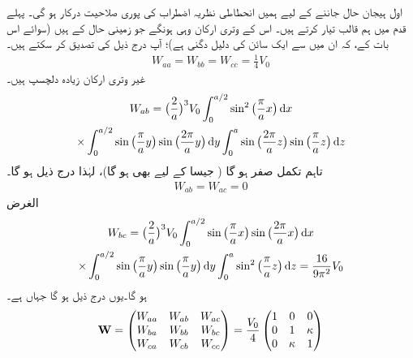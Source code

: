  اول ہیجان حال جاننے کے لیے ہمیں انحطاطی نظریہ اضطراب کی پوری صلاحیت درکار ہو گی۔ پہلے قدم میں ہم قالب  تیار کرتے ہیں۔ اس کے وتری ارکان وہی ہونگے جو زمینی حال کے ہیں (سوائے اس بات کے، کہ ان میں سے ایک سائن کی  دلیل دگنی ہے)؛ آپ درج ذیل کی تصدیق کر سکتے ہیں۔
\begin{align*}
W_{aa} = W_{bb} = W_{cc} = \frac{1}{4} V_0
\end{align*}
غیر وتری ارکان زیادہ دلچسپ ہیں۔ 
\begin{multline*}
W_{ab} = \big ( \frac{2}{a} \big )^3 V_0 \int_0^{a/2} \sin^2 \big ( \frac{\pi}{a} x \big ) \dif x\\
\times \int_0^{a/2} \sin \big (\frac{\pi}{a} y \big ) \sin \big ( \frac{2 \pi}{a} y \big ) \dif y \int_0^a \sin \big ( \frac{2 \pi}{a} z \big ) \sin \big ( \frac{\pi}{a} z \big ) \dif z
\end{multline*}
تاہم  تکمل صفر ہو گا ( جیسا  کے لیے بھی ہو گا)، لہٰذا درج ذیل ہو گا۔ 
\begin{align*}
W_{ab} = W_{ac} = 0
\end{align*}
الغرض 
\begin{multline*}
W_{bc} = \big ( \frac{2}{a} \big )^3 V_0 \int_0^{a/2} \sin \big ( \frac{\pi}{a} x \big ) \sin \big (\frac{2 \pi}{a} x \big ) \dif x\\
\times \int_0^{a/2} \sin \big (\frac{\pi}{a} y \big ) \sin \big ( \frac{\pi}{a} y \big ) \dif y \int_0^a \sin^2 \big ( \frac{\pi}{a} z \big ) \dif z = \frac{16}{9 \pi^2} V_0
\end{multline*}
ہو گا۔یوں درج ذیل ہو گا جہاں  ہے۔
\begin{align}
\operatorname{\mathbf{W}} =
\begin{pmatrix}
W_{aa} & W_{ab} & W_{ac} \\
W_{ba} & W_{bb} & W_{bc} \\
W_{ca} & W_{cb} & W_{cc}
\end{pmatrix}=
 \frac{V_0}{4}
\begin{pmatrix}
1 & 0 & 0 \\
0 & 1 & \kappa \\
0 & \kappa & 1
\end{pmatrix}
\end{align}

